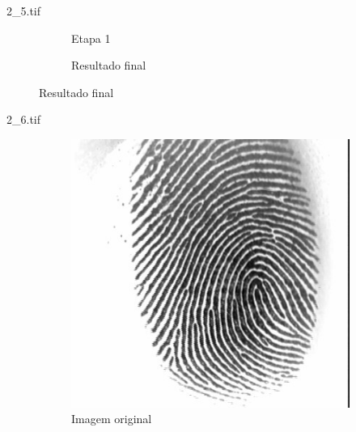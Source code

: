 \documentclass{beamer}
\begin{document}
\begin{frame}{2\_5.tif}
\begin{figure}
\begin{subfigure}[!ht]{0.32\textwidth}
                \caption{Etapa 1}
            \end{subfigure}
            \begin{subfigure}[!ht]{0.32\textwidth}
                \caption{Resultado final}
            \end{subfigure}
        \end{figure}
    \end{frame}

    \begin{frame}{2\_6.tif}
        \begin{figure}
            \centering
            \begin{subfigure}[!ht]{0.32\textwidth}
                \includegraphics[width=\columnwidth]{Fingerprints/2_6.jpg}
                \caption{Imagem original}
            \end{subfigure}
            \begin{subfigure}[!ht]{0.32\textwidth}

\end{subfigure}
\end{figure}
\end{frame}
\end{document}
